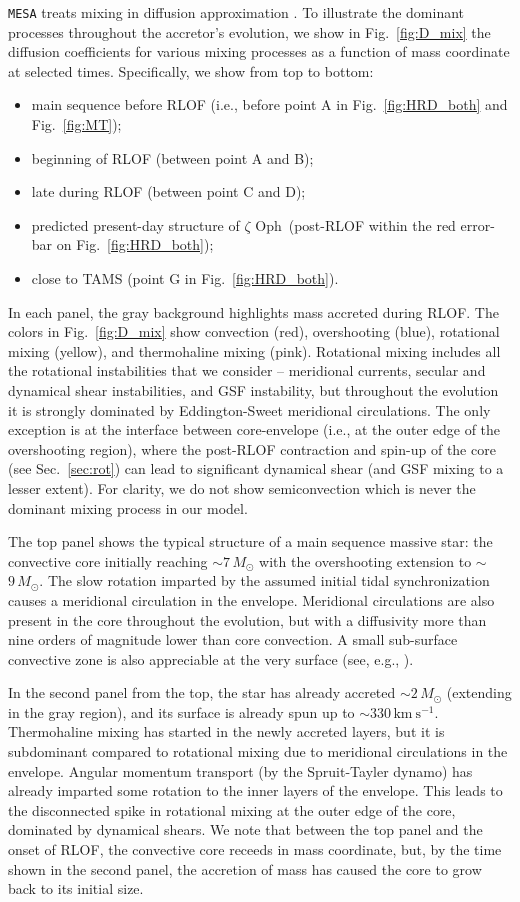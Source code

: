 \documentclass[twocolumn,twocolappendix,trackchanges]{aastex63}
\newcommand{\kms}{{\mathrm{km\ s^{-1}}}}
\DeclareRobustCommand{\Figref}[1]{Fig.~\ref{#1}}
\DeclareRobustCommand{\Secref}[1]{Sec.~\ref{#1}}
\newcommand{\zoph}{$\zeta$ Oph}
\begin{document}
\texttt{MESA} treats mixing in diffusion approximation
\citep{paxton:11}. To illustrate the dominant processes throughout the
accretor's evolution, we show in \Figref{fig:D_mix} the diffusion
coefficients for various mixing processes as a function of mass
coordinate at selected times. Specifically, we show from top to
bottom:
\begin{itemize}
\item main sequence before RLOF (i.e., before point A in
  \Figref{fig:HRD_both} and \Figref{fig:MT});
\item beginning of RLOF (between point A and B);
\item late during RLOF (between point C and D);
\item predicted present-day structure of \zoph\ (post-RLOF within the
  red error-bar on \Figref{fig:HRD_both});
\item close to TAMS (point G in \Figref{fig:HRD_both}).
\end{itemize}
In each panel, the gray background highlights mass accreted during
RLOF.  The colors in \Figref{fig:D_mix} show convection (red),
overshooting (blue), rotational mixing (yellow), and thermohaline
mixing (pink). Rotational mixing includes all the rotational
instabilities that we consider -- meridional currents, secular and
dynamical shear instabilities, and GSF instability, but throughout the
evolution it is strongly dominated by Eddington-Sweet meridional
circulations. The only exception is at the interface between
core-envelope (i.e., at the outer edge of the overshooting region),
where the post-RLOF contraction and spin-up of the core (see
\Secref{sec:rot}) can lead to significant dynamical shear (and GSF
mixing to a lesser extent). For clarity, we do not show
semiconvection which is never the dominant mixing process in our
model.

The top panel shows the typical structure of a main sequence massive star:
the convective core initially reaching
$\sim$$7\,M_\odot$ with the overshooting extension to $\sim$$9\,M_\odot$. The
slow rotation imparted by the assumed initial tidal synchronization
causes a meridional circulation in the envelope. Meridional
circulations are also present in the core throughout the evolution,
but with a diffusivity more than nine orders of magnitude lower than
core convection. A small sub-surface
convective zone is also appreciable at the very surface (see, e.g., \citealt{cantiello:21}).

In the second panel from the top, the star has already accreted
$\sim$$2\,M_\odot$ (extending in the gray region), and its surface is already spun up to $\sim
330\,\kms$. Thermohaline mixing has started in the newly accreted layers, but it is subdominant compared to rotational mixing due to meridional circulations in the envelope.  Angular momentum transport (by the Spruit-Tayler dynamo) has already imparted some rotation to the inner layers of the envelope. This leads to the disconnected spike in rotational mixing at the outer edge of the core, dominated by dynamical shears.  We note that between the top panel and the onset of RLOF, the convective core receeds in mass coordinate, but, by the time shown in the second panel, the accretion of mass has caused the core to grow back to its initial size.
\end{document}
